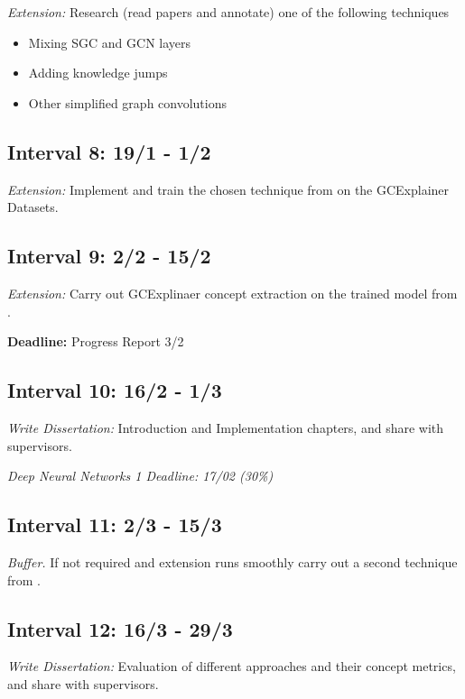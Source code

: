 \textit{Extension:} Research (read papers and annotate) one of the following techniques

\begin{itemize}[noitemsep]
    \item Mixing SGC and GCN layers
    \item Adding knowledge jumps
    \item Other simplified graph convolutions
\end{itemize}

\subsection{Interval 8: 19/1 - 1/2}

\textit{Extension:} Implement and train the chosen technique from  on the GCExplainer Datasets.

\subsection{Interval 9: 2/2 - 15/2}

\textit{Extension:} Carry out GCExplinaer concept extraction on the trained model from .

\textbf{Deadline:} Progress Report 3/2

\subsection{Interval 10: 16/2 - 1/3}

\textit{Write Dissertation:} Introduction and Implementation chapters, and share with supervisors.

\textit{Deep Neural Networks 1 Deadline: 17/02 (30\%)}

\subsection{Interval 11: 2/3 - 15/3}

\textit{Buffer.} If not required and extension runs smoothly carry out a second technique from .

\subsection{Interval 12: 16/3 - 29/3}

\textit{Write Dissertation:} Evaluation of different approaches and their concept metrics, and share with supervisors.

